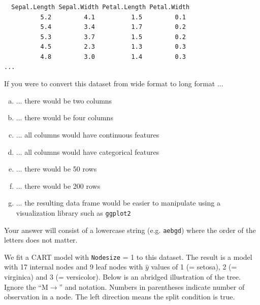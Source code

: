 \documentclass[12pt,landscape]{article}
\newcommand{\instr}{\small Your answer will consist of a lowercase string (e.g. \texttt{aebgd}) where the order of the letters does not matter. \normalsize}
\begin{document}
\lstset{
  basicstyle=\footnotesize,
  xleftmargin=.25\textwidth, xrightmargin=.25\textwidth
}
\begin{lstlisting}
  Sepal.Length Sepal.Width Petal.Length Petal.Width
          5.2         4.1          1.5         0.1
          5.4         3.4          1.7         0.2
          5.3         3.7          1.5         0.2
          4.5         2.3          1.3         0.3
          4.8         3.0          1.4         0.3
...
\end{lstlisting}
\vspace{-1cm}
\vspace{-0.2cm}\benum{} 

If you were to convert this dataset from wide format to long format ...

\begin{enumerate}[(a)]
\item ... there would be two columns
\item ... there would be four columns
\item ... all columns would have continuous features
\item ... all columns would have categorical features
\item ... there would be 50 rows
\item ... there would be 200 rows
\item ... the resulting data frame would be easier to manipulate using a visualization library such as \texttt{ggplot2}
\end{enumerate}
\eenum\instr\pagebreak


\problem{}  We fit a CART model with \texttt{Nodesize} = 1 to this dataset. The result is a model with 17 internal nodes and 9 leaf nodes with $\hat{y}$ values of 1 (= setosa), 2 (= virginica) and 3 (= versicolor). Below is an abridged illustration of the tree. Ignore the ``M$\rightarrow$'' and  notation. Numbers in parentheses indicate number of observation in a node. The left direction means the split condition is true.
\end{document}
